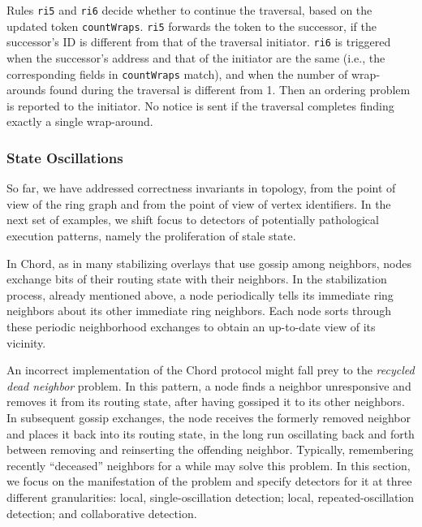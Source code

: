 \documentclass{sig-alt-full}
\newcommand{\ol}[1]{{\tt\footnotesize#1}}
\begin{document}
Rules \ol{ri5} and \ol{ri6} decide whether to continue
the traversal, based on the updated token \ol{countWraps}.  \ol{ri5}
forwards the token to the successor, if the successor's
ID is different from that of the traversal initiator.
\ol{ri6} is triggered when the successor's address and
that of the initiator are the same (i.e., the
corresponding fields
in \ol{countWraps} match), and when the number
of wrap-arounds found during the traversal is different
from 1.  Then an ordering problem is reported to the
initiator.  No notice is sent if the traversal completes
finding exactly a single wrap-around.






\subsubsection{State Oscillations}
\label{sec:consistency:stale}

So far, we have addressed correctness invariants in topology, from the
point of view of the ring graph and from the point of view of vertex
identifiers.  In the next set of examples, we shift focus to detectors of
potentially pathological execution patterns, namely the proliferation of
stale state.

In Chord, as in many stabilizing overlays that use gossip among
neighbors, nodes exchange bits of their routing state with their
neighbors.  In the stabilization process, already mentioned above, a
node periodically tells its immediate ring neighbors about its other
immediate ring neighbors.  Each node sorts through these periodic
neighborhood exchanges to obtain an up-to-date view of its vicinity.

An incorrect implementation of the Chord protocol might fall prey to the
\emph{recycled dead neighbor} problem.  In this pattern, a node finds a
neighbor unresponsive and removes it from its routing state, after
having gossiped it to its other neighbors.  In subsequent gossip
exchanges, the node receives the formerly removed neighbor and places it
back into its routing state, in the long run oscillating back and forth
between removing and reinserting the offending neighbor.  Typically,
remembering recently ``deceased'' neighbors for a while may solve this
problem.  In this section, we focus on the manifestation of the problem
and specify detectors for it at three different granularities: local,
single-oscillation detection; local, repeated-oscillation detection; and
collaborative detection.
\end{document}
